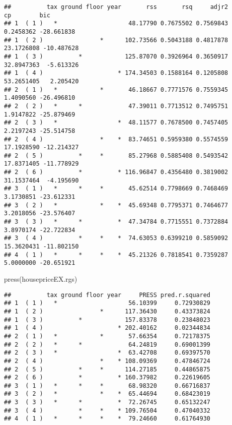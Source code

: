 \documentclass[
]{book}
\newenvironment{Shaded}{\begin{snugshade}}{\end{snugshade}}
\newcommand{\FunctionTok}[1]{\textcolor[rgb]{0.00,0.00,0.00}{#1}}
\newcommand{\NormalTok}[1]{#1}
\begin{document}
\begin{verbatim}
##          tax ground floor year       rss       rsq     adjr2         cp        bic
## 1  ( 1 )   *                    48.17790 0.7675502 0.7569843  0.2458362 -28.661838
## 1  ( 2 )                *      102.73566 0.5043188 0.4817878 23.1726808 -10.487628
## 1  ( 3 )          *            125.87070 0.3926964 0.3650917 32.8947363  -5.613326
## 1  ( 4 )                     * 174.34503 0.1588164 0.1205808 53.2651405   2.205420
## 2  ( 1 )   *            *       46.18667 0.7771576 0.7559345  1.4090560 -26.496810
## 2  ( 2 )   *      *             47.39011 0.7713512 0.7495751  1.9147822 -25.879469
## 2  ( 3 )   *                 *  48.11577 0.7678500 0.7457405  2.2197243 -25.514758
## 2  ( 4 )                *    *  83.74651 0.5959380 0.5574559 17.1928590 -12.214327
## 2  ( 5 )          *     *       85.27968 0.5885408 0.5493542 17.8371405 -11.778929
## 2  ( 6 )          *          * 116.96847 0.4356480 0.3819002 31.1537464  -4.195690
## 3  ( 1 )   *      *     *       45.62514 0.7798669 0.7468469  3.1730851 -23.612331
## 3  ( 2 )   *            *    *  45.69348 0.7795371 0.7464677  3.2018056 -23.576407
## 3  ( 3 )   *      *          *  47.34784 0.7715551 0.7372884  3.8970174 -22.722834
## 3  ( 4 )          *     *    *  74.63053 0.6399210 0.5859092 15.3620431 -11.802150
## 4  ( 1 )   *      *     *    *  45.21326 0.7818541 0.7359287  5.0000000 -20.651921
\end{verbatim}

\begin{Shaded}
\begin{Highlighting}[]
\FunctionTok{press}\NormalTok{(housepriceEX.rgs)}
\end{Highlighting}
\end{Shaded}

\begin{verbatim}
##          tax ground floor year     PRESS pred.r.squared
## 1  ( 1 )   *                    56.10399     0.72930829
## 1  ( 2 )                *      117.36430     0.43373824
## 1  ( 3 )          *            157.83378     0.23848023
## 1  ( 4 )                     * 202.40162     0.02344834
## 2  ( 1 )   *            *       57.66354     0.72178375
## 2  ( 2 )   *      *             64.24819     0.69001399
## 2  ( 3 )   *                 *  63.42708     0.69397570
## 2  ( 4 )                *    * 108.09369     0.47846724
## 2  ( 5 )          *     *      114.27185     0.44865875
## 2  ( 6 )          *          * 160.37982     0.22619605
## 3  ( 1 )   *      *     *       68.98320     0.66716837
## 3  ( 2 )   *            *    *  65.44694     0.68423019
## 3  ( 3 )   *      *          *  72.26745     0.65132247
## 3  ( 4 )          *     *    * 109.76504     0.47040332
## 4  ( 1 )   *      *     *    *  79.24660     0.61764930
\end{verbatim}
\end{document}
